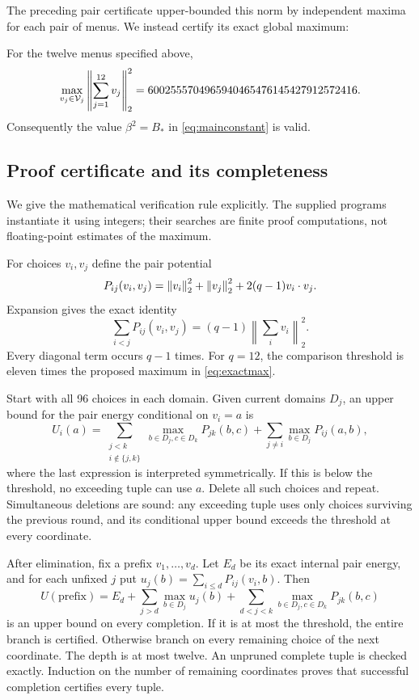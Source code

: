 The preceding pair certificate upper-bounded this norm by independent
maxima for each pair of menus. We instead certify its exact global maximum:
\begin{theorem}\label{thm:finite}
For the twelve menus specified above,
\begin{equation}\label{eq:exactmax}
 \max_{v_j\in\mathcal V_j}
       \left\|\sum_{j=1}^{12}v_j\right\|_2^2
 =6002555704965940465476145427912572416.
\end{equation}
Consequently the value \(\beta^2=B_*\) in
\eqref{eq:mainconstant} is valid.
\end{theorem}

\subsection{Proof certificate and its completeness}

We give the mathematical verification rule explicitly. The supplied
programs instantiate it using integers; their searches are finite proof
computations, not floating-point estimates of the maximum.

For choices \(v_i,v_j\) define the pair potential
\[
 P_{ij}(v_i,v_j)
 =\left\lVert v_i\right\rVert_2^2+\left\lVert v_j\right\rVert_2^2+2(q-1)v_i\cdot v_j.
\]
Expansion gives the exact identity
\begin{equation}\label{eq:energyidentity}
 \sum_{i<j}P_{ij}(v_i,v_j)
 =(q-1)\left\|\sum_i v_i\right\|_2^2.
\end{equation}
Every diagonal term occurs \(q-1\) times. For \(q=12\), the comparison
threshold is eleven times the proposed maximum in \eqref{eq:exactmax}.

Start with all 96 choices in each domain. Given current domains \(D_j\),
an upper bound for the pair energy conditional on \(v_i=a\) is
\begin{equation}\label{eq:delete}
 U_i(a)=
 \sum_{\substack{j<k\\i\notin\{j,k\}}}
       \max_{b\in D_j,c\in D_k}P_{jk}(b,c)
 +\sum_{j\ne i}\max_{b\in D_j}P_{ij}(a,b),
\end{equation}
where the last expression is interpreted symmetrically. If this is below
the threshold, no exceeding tuple can use \(a\). Delete all such choices
and repeat. Simultaneous deletions are sound: any exceeding tuple uses
only choices surviving the previous round, and its conditional upper
bound exceeds the threshold at every coordinate.

After elimination, fix a prefix \(v_1,\ldots,v_d\). Let \(E_d\) be its
exact internal pair energy, and for each unfixed \(j\) put
\(u_j(b)=\sum_{i\le d}P_{ij}(v_i,b)\). Then
\begin{equation}\label{eq:branchupper}
 U(\text{prefix})=
 E_d+\sum_{j>d}\max_{b\in D_j}u_j(b)
       +\sum_{d<j<k}\max_{b\in D_j,c\in D_k}P_{jk}(b,c)
\end{equation}
is an upper bound on every completion. If it is at most the threshold,
the entire branch is certified. Otherwise branch on every remaining
choice of the next coordinate. The depth is at most twelve.
An unpruned complete tuple is checked exactly. Induction on the number
of remaining coordinates proves that successful completion certifies
every tuple.

